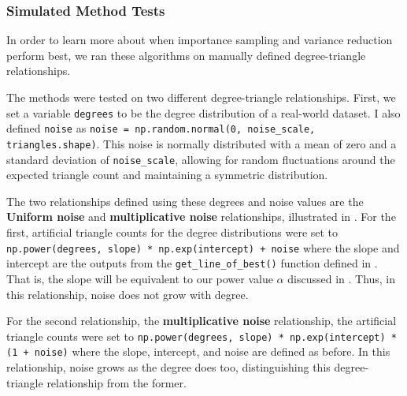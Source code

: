 \documentclass[11pt, margin=1in]{article}
\begin{document}
\subsubsection{Simulated Method Tests}
\label{sec:methods-simulated-test}

In order to learn more about when importance sampling and variance reduction perform best, we ran these algorithms on manually defined degree-triangle relationships.

The methods were tested on two different degree-triangle relationships.
First, we set a variable \lstinline{degrees} to be the degree distribution of a real-world dataset.
I also defined \lstinline{noise} as \lstinline{noise = np.random.normal(0, noise_scale, triangles.shape)}.
This noise is normally distributed with a mean of zero and a standard deviation of \lstinline{noise_scale}, allowing for random fluctuations around the expected triangle count and maintaining a symmetric distribution.

The two relationships defined using these degrees and noise values are the \textbf{Uniform noise} and \textbf{multiplicative noise} relationships, illustrated in .
For the first, artificial triangle counts for the degree distributions were set to \lstinline{np.power(degrees, slope) * np.exp(intercept) + noise} where the slope and intercept are the outputs from the \lstinline{get_line_of_best()} function defined in .
That is, the slope will be equivalent to our power value $\alpha$ discussed in .
Thus, in this relationship, noise does not grow with degree.

For the second relationship, the \textbf{multiplicative noise} relationship, the artificial triangle counts were set to \lstinline{np.power(degrees, slope) * np.exp(intercept) * (1 + noise)} where the slope, intercept, and noise are defined as before.
In this relationship, noise grows as the degree does too, distinguishing this degree-triangle relationship from the former.
\end{document}
